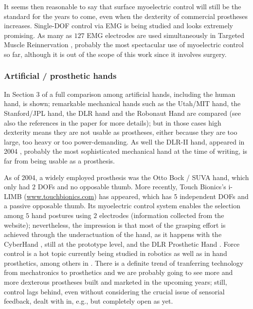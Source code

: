 It seems then reasonable to say that surface myoelectric control will still be the
standard for the years to come, even when the dexterity of commercial prostheses
increases. Single-DOF control via EMG is being studied \cite{englehart08} and looks
extremely promising. As many as $127$ EMG electrodes are used simultaneously in Targeted
Muscle Reinnervation \cite{kuiken06}, probably the most spectacular use of myoelectric control
so far, although it is out of the scope of this work since it involves surgery.

\subsubsection{Artificial / prosthetic hands}

In Section $3$ of \cite{zecca02} a full comparison among artificial hands, including
the human hand, is shown; remarkable mechanical hands such as the Utah/MIT hand, the
Stanford/JPL hand, the DLR hand and the Robonaut Hand are compared (see also the
references in the paper for more details); but in those cases high dexterity means they
are not usable as prostheses, either because they are too large, too heavy or too power-demanding.
As well the DLR-II hand, appeared in 2004 \cite{ButFisGre2004}, probably the most sophisticated
mechanical hand at the time of writing, is far from being usable as a prosthesis.

As of 2004, a widely employed prosthesis was the Otto Bock / SUVA hand, which only had $2$ DOFs and
no opposable thumb. More recently, Touch Bionics's i-LIMB (\url{www.touchbionics.com}) has appeared, which has
5 independent DOFs and a passive opposable thumb. Its myoelectric control system enables
the selection among $5$ hand postures using $2$ electrodes (information collected from the
website); nevertheless, the impression is that most of the grasping effort is achieved through
the underactuation of the hand, as it happens with the CyberHand \cite{cyberhand}, still at
the prototype level, and the DLR Prosthetic Hand \cite{Hua2006}. Force control is a hot topic
currently being studied in robotics \cite{ott,thomas} as well as in hand prosthetics, among others
in \cite{meek1,meek2}. There is a definite trend of tranferring technology from
mechatronics to prosthetics and we are probably going to see more and more dexterous
prostheses built and marketed in the upcoming years; still, control
lags behind, even without considering the crucial issue of sensorial feedback,
dealt with in, e.g., \cite{cipriani} but completely open as yet.

